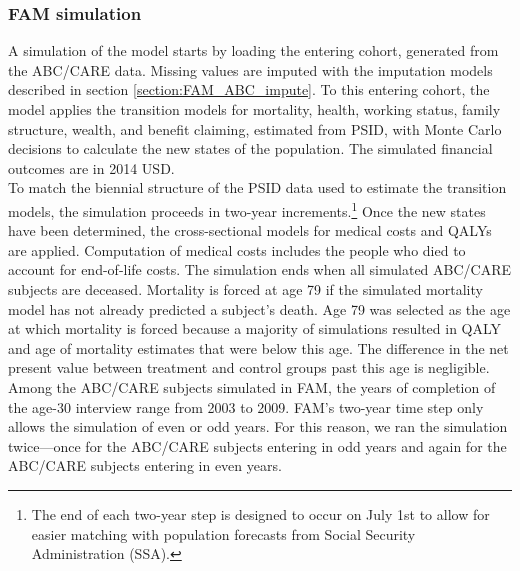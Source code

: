


\subsubsection{FAM simulation}

\noindent A simulation of the model starts by loading the entering cohort, generated from the ABC/CARE data. Missing values are imputed with the imputation models described in section \ref{section:FAM_ABC_impute}.  To this entering cohort, the model applies the transition models for mortality, health, working status, family structure, wealth, and benefit claiming, estimated from PSID, with Monte Carlo decisions to calculate the new states of the population.
The simulated financial outcomes are in 2014 USD. \\


\noindent To match the biennial structure of the PSID data used to estimate the transition models, the simulation proceeds in two-year increments.\footnote{The end of each two-year step is designed to occur on July 1st to allow for easier matching with population forecasts from Social Security Administration (SSA).}
Once the new states have been determined, the cross-sectional models for medical costs and QALYs are applied.
Computation of medical costs includes the people who died to account for end-of-life costs.
The simulation ends when all simulated ABC/CARE subjects are deceased. Mortality is forced at age 79 if the simulated mortality model has not already predicted a subject's death. Age 79 was selected as the age at which mortality is forced because a majority of simulations resulted in QALY and age of mortality estimates that were below this age. The difference in the net present value between treatment and control groups past this age is negligible.\\

\noindent Among the ABC/CARE subjects simulated in FAM, the years of completion of the age-30 interview range from 2003 to 2009.
FAM's two-year time step only allows the simulation of even or odd years.
For this reason, we ran the simulation twice---once for the ABC/CARE subjects entering in odd years and again for the ABC/CARE subjects entering in even years. \\

